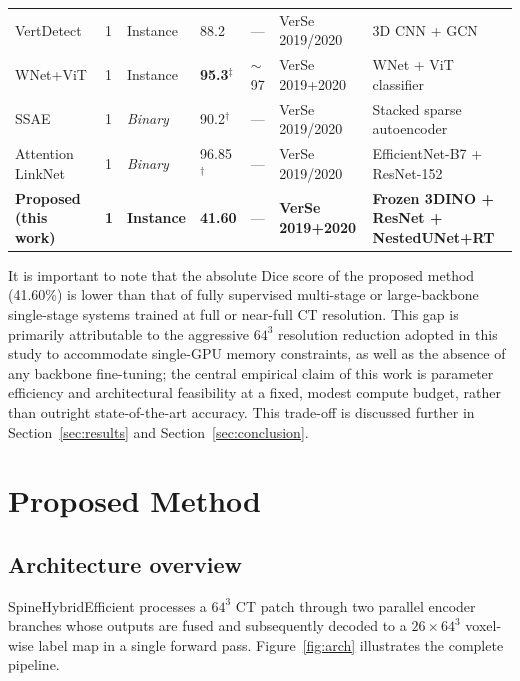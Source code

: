 \documentclass[preprint,12pt,3p]{elsarticle}
\begin{document}
\begin{table}[t]
\begin{adjustbox}{width=\textwidth}
\begin{tabular}{L{3.0cm}C{1.8cm}C{1.5cm}C{1.3cm}C{1.4cm}C{2.0cm}L{5.0cm}}
VertDetect \cite{vertdetect2023} & 1 & Instance & 88.2 & --- & VerSe 2019/2020 & 3D CNN + GCN \\
WNet+ViT \cite{montpetit2025} & 1 & Instance & \textbf{95.3}$^\ddagger$ & $\sim$97 & VerSe 2019+2020 & WNet + ViT classifier \\
SSAE \cite{ssae2022} & 1 & \textit{Binary} & 90.2$^\dagger$ & --- & VerSe 2019/2020 & Stacked sparse autoencoder \\
Attention LinkNet \cite{alhamouri2025} & 1 & \textit{Binary} & 96.85$^\dagger$ & --- & VerSe 2019/2020 & EfficientNet-B7 + ResNet-152 \\
\midrule
{}
\textbf{Proposed (this work)} & \textbf{1} & \textbf{Instance} & \textbf{41.60} & --- & \textbf{VerSe 2019+2020} & \textbf{Frozen 3DINO + ResNet + NestedUNet+RT} \\
\bottomrule
\end{tabular}
\end{adjustbox}
\end{table}

It is important to note that the absolute Dice score of the proposed method (41.60\%) is lower than that of fully supervised multi-stage or large-backbone single-stage systems trained at full or near-full CT resolution. This gap is primarily attributable to the aggressive $64^3$ resolution reduction adopted in this study to accommodate single-GPU memory constraints, as well as the absence of any backbone fine-tuning; the central empirical claim of this work is parameter efficiency and architectural feasibility at a fixed, modest compute budget, rather than outright state-of-the-art accuracy. This trade-off is discussed further in Section~\ref{sec:results} and Section~\ref{sec:conclusion}.

\section{Proposed Method}
\label{sec:method}

\subsection{Architecture overview}
SpineHybridEfficient processes a $64^3$ CT patch through two parallel encoder branches whose outputs are fused and subsequently decoded to a $26 \times 64^3$ voxel-wise label map in a single forward pass. Figure~\ref{fig:arch} illustrates the complete pipeline.
\end{document}

